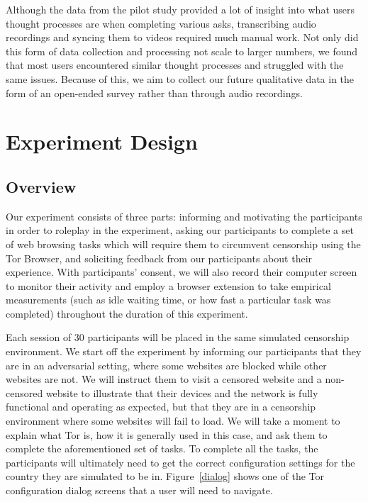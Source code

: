 \documentclass[letterpaper,twocolumn,11pt]{article}
\begin{document}
Although the data from the pilot study provided a lot of insight into what users thought processes
are when completing various asks, transcribing audio recordings and syncing them to videos
required much manual work. Not only did this form of data collection and processing not scale 
to larger numbers, we found that most users encountered similar thought processes and struggled
with the same issues. Because of this, we aim to collect our future qualitative data in the form of 
an open-ended survey rather than through audio recordings. 

\section{Experiment Design}

\subsection{Overview} 
Our experiment consists of three parts: informing and motivating the participants in order 
to roleplay in the experiment, asking our participants to complete a set of web browsing tasks which will 
require them to circumvent censorship using the Tor Browser, and soliciting feedback from our participants
about their experience. With participants' consent, we will also record their computer screen to monitor 
their activity and employ a browser extension to take empirical measurements (such as idle waiting time, 
or how fast a particular task was completed) throughout the duration of this experiment. 

Each session of 30 participants will be placed in the same simulated censorship environment. 
We start off the experiment by informing our participants that they are in an adversarial setting, 
where some websites are blocked while other websites are not. We will instruct them to visit a censored
website and a non-censored website to illustrate that their devices and the network is fully functional and
operating as expected, but that they are in a censorship environment where some websites will fail to load. 
We will take a moment to explain what Tor is, how it is generally used in this case, and ask them to complete 
the aforementioned set of tasks. To complete all the tasks, the participants will ultimately need to get the correct
configuration settings for the country they are simulated to be in.  Figure~\ref{dialog} shows one of the 
Tor configuration dialog screens that a user will need to navigate. 
\end{document}
